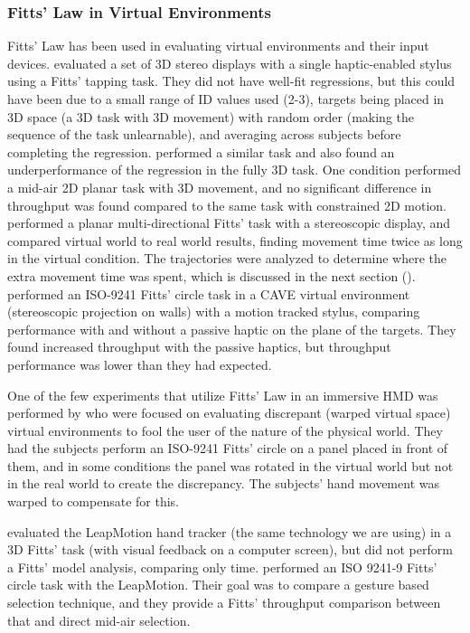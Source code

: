 \subsubsection{Fitts' Law in Virtual Environments}\label{applying-fitts-to-virtual-environment}

Fitts' Law has been used in evaluating virtual environments and their input devices.
\citet{chun_evaluating_2004} evaluated a set of 3D stereo displays with a single haptic-enabled stylus using a Fitts' tapping task.
They did not have well-fit regressions, but this could have been due to a small range of ID values used (2-3), targets being placed in 3D space (a 3D task with 3D movement) with random order (making the sequence of the task unlearnable), and averaging across subjects before completing the regression.
\citet{teather_evaluating_2010} performed a similar task and also found an underperformance of the regression in the fully 3D task.
One condition performed a mid-air 2D planar task with 3D movement, and no significant difference in throughput was found compared to the same task with constrained 2D motion.
\citet{liu_comparing_2009} performed a planar multi-directional Fitts' task with a stereoscopic display, and compared virtual world to real world results, finding movement time twice as long in the virtual condition.
The trajectories were analyzed to determine where the extra movement time was spent, which is discussed in the next section ().
\citet{teather_pointing_2011} performed an ISO-9241 Fitts' circle task in a CAVE virtual environment (stereoscopic projection on walls) with a motion tracked stylus, comparing performance with and without a passive haptic on the plane of the targets.
They found increased throughput with the passive haptics, but throughput performance was lower than they had expected.

One of the few experiments that utilize Fitts' Law in an immersive HMD was performed by \citet{kohli_redirected_2012} who were focused on evaluating discrepant (warped virtual space) virtual environments to fool the user of the nature of the physical world.
They had the subjects perform an ISO-9241 Fitts' circle on a panel placed in front of them, and in some conditions the panel was rotated in the virtual world but not in the real world to create the discrepancy.
The subjects' hand movement was warped to compensate for this.

\citet{coelho_pointing_2014} evaluated the LeapMotion hand tracker (the same technology we are using) in a 3D Fitts' task (with visual feedback on a computer screen), but did not perform a Fitts' model analysis, comparing only time.
\citet{seixas_one_2015} performed an ISO 9241-9 Fitts' circle task with the LeapMotion.
Their goal was to compare a gesture based selection technique, and they provide a Fitts' throughput comparison between that and direct mid-air selection.

